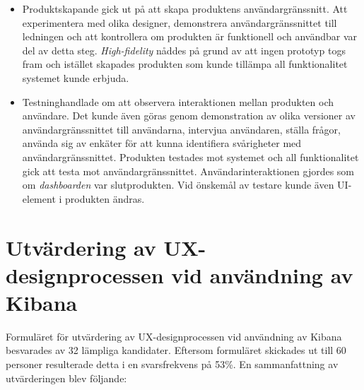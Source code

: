 \documentclass[12pt]{kththesis}
\begin{document}
\begin{itemize}
\item Produktskapande gick ut på att skapa produktens användargränssnitt. Att experimentera med olika designer, demonstrera användargränssnittet till ledningen och att kontrollera om produkten är funktionell och användbar var del av detta steg. \textit{High-fidelity} nåddes på grund av att ingen prototyp togs fram och istället skapades produkten som kunde tillämpa all funktionalitet systemet kunde erbjuda.
\item Testninghandlade om att observera interaktionen mellan produkten och användare. Det kunde även göras genom demonstration av olika versioner av användargränssnittet till användarna, intervjua användaren, ställa frågor, använda sig av enkäter för att kunna identifiera svårigheter med användargränssnittet. Produkten testades mot systemet och all funktionalitet gick att testa mot användargränssnittet. Användarinteraktionen gjordes som om \textit{dashboarden} var slutprodukten. Vid önskemål av testare kunde även UI-element i produkten ändras. 
\end{itemize}

\section{Utvärdering av UX-designprocessen vid användning av Kibana}
Formuläret för utvärdering av UX-designprocessen vid användning av Kibana besvarades av 32 lämpliga kandidater. Eftersom formuläret skickades ut till 60 personer resulterade detta i en svarsfrekvens på 53\%. En sammanfattning av utvärderingen blev följande:
\end{document}
